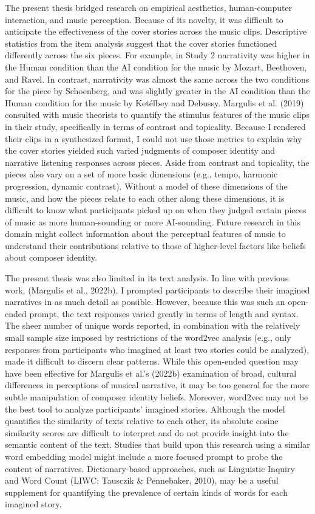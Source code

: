 \documentclass[12pt,twoside]{reedthesis}
\begin{document}
The present thesis bridged research on empirical aesthetics, human-computer interaction, and music perception. Because of its novelty, it was difficult to anticipate the effectiveness of the cover stories across the music clips. Descriptive statistics from the item analysis suggest that the cover stories functioned differently across the six pieces. For example, in Study 2 narrativity was higher in the Human condition than the AI condition for the music by Mozart, Beethoven, and Ravel. In contrast, narrativity was almost the same across the two conditions for the piece by Schoenberg, and was slightly greater in the AI condition than the Human condition for the music by Ketélbey and Debussy. Margulis et al. (2019) consulted with music theorists to quantify the stimulus features of the music clips in their study, specifically in terms of contrast and topicality. Because I rendered their clips in a synthesized format, I could not use those metrics to explain why the cover stories yielded such varied judgments of composer identity and narrative listening responses across pieces. Aside from contrast and topicality, the pieces also vary on a set of more basic dimensions (e.g., tempo, harmonic progression, dynamic contrast). Without a model of these dimensions of the music, and how the pieces relate to each other along these dimensions, it is difficult to know what participants picked up on when they judged certain pieces of music as more human-sounding or more AI-sounding. Future research in this domain might collect information about the perceptual features of music to understand their contributions relative to those of higher-level factors like beliefs about composer identity. 

The present thesis was also limited in its text analysis. In line with previous work, (Margulis et al., 2022b), I prompted participants to describe their imagined narratives in as much detail as possible. However, because this was such an open-ended prompt, the text responses varied greatly in terms of length and syntax. The sheer number of unique words reported, in combination with the relatively small sample size imposed by restrictions of the word2vec analysis (e.g., only responses from participants who imagined at least two stories could be analyzed), made it difficult to discern clear patterns. While this open-ended question may have been effective for Margulis et al.’s (2022b) examination of broad, cultural differences in perceptions of musical narrative, it may be too general for the more subtle manipulation of composer identity beliefs. Moreover, word2vec may not be the best tool to analyze participants’ imagined stories. Although the model quantifies the similarity of texts relative to each other, its absolute cosine similarity scores are difficult to interpret and do not provide insight into the semantic content of the text. Studies that build upon this research using a similar word embedding model might include a more focused prompt to probe the content of narratives. Dictionary-based approaches, such as Linguistic Inquiry and Word Count (LIWC; Tausczik \& Pennebaker, 2010), may be a useful supplement for quantifying the prevalence of certain kinds of words for each imagined story.
\end{document}

